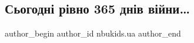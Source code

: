  
 
 
 
 

\subsection{Сьогодні рівно 365 днів війни…}
\label{sec:24_02_2023.fb.nbukids.ua.1.sogodn__r_vno_365_dn}

\ifcmt
 author_begin
   author_id nbukids.ua
 author_end
\fi
